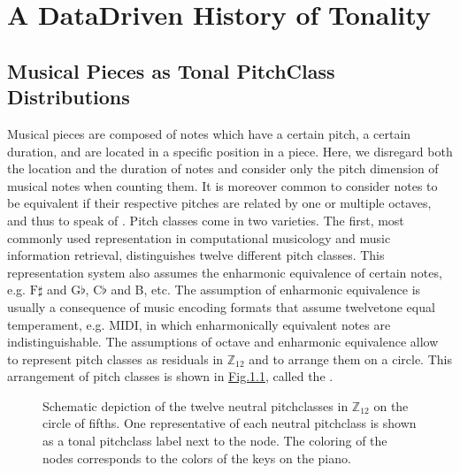 \documentclass[letterpaper,10pt,english]{sphinxmanual}
\begin{document}
\chapter{A Data\sphinxhyphen{}Driven History of Tonality}
\label{\detokenize{tonality:a-data-driven-history-of-tonality}}\label{\detokenize{tonality::doc}}


\section{Musical Pieces as Tonal Pitch\sphinxhyphen{}Class Distributions}
\label{\detokenize{tonality:musical-pieces-as-tonal-pitch-class-distributions}}
Musical pieces are composed of notes which have a certain pitch, a certain duration, and are
located in a specific position in a piece. Here, we disregard both the location and the duration
of notes and consider only the pitch dimension of musical notes when counting them. It is
moreover common to consider notes to be equivalent if their respective pitches are related by
one or multiple octaves, and thus to speak of . Pitch classes come in two varieties.
The first, most commonly used representation in computational musicology and music
information retrieval, distinguishes twelve different pitch classes. This representation system
also assumes the enharmonic equivalence of certain notes, e.g. \(\text{F}\sharp\)
and \(\text{G}\flat\), \(\text{C}\flat\) and B, etc. The
assumption of enharmonic equivalence is usually a consequence of music encoding formats
that assume twelve\sphinxhyphen{}tone equal temperament, e.g. MIDI, in which enharmonically equivalent
notes are indistinguishable. The assumptions of octave and enharmonic equivalence allow to
represent pitch classes as residuals in \(\mathbb{Z}_{12}\) and to arrange them on a circle.
This arrangement of pitch classes is shown in \hyperref[\detokenize{tonality:circle-of-fifths}]{Fig.\@ \ref{\detokenize{tonality:circle-of-fifths}}}, called the .

\begin{figure}[htbp]
\centering
\capstart

\noindent{}
\caption{Schematic depiction of the twelve neutral pitch\sphinxhyphen{}classes in \(\mathbb{Z}_{12}\) on the circle of fifths. One
representative of each neutral pitch\sphinxhyphen{}class is shown as a tonal pitch\sphinxhyphen{}class label next to the
node. The coloring of the nodes corresponds to the colors of the keys on the piano.}\label{\detokenize{tonality:id16}}\label{\detokenize{tonality:circle-of-fifths}}\end{figure}
\end{document}

